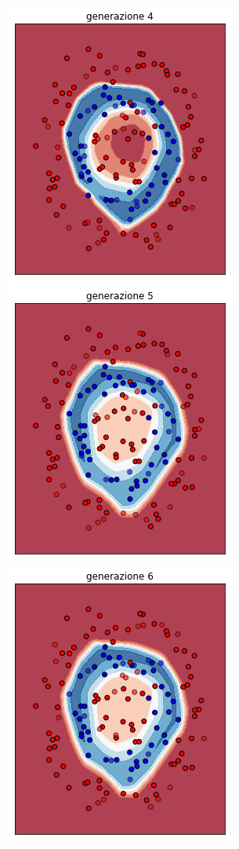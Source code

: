 \documentclass[12pt,a4paper]{report}
\begin{document}
\begin{figure}[H]
 \\
 \includegraphics[scale = 0.35]{images/circle+-rnd-acc./4}
 \includegraphics[scale = 0.35]{images/circle+-rnd-acc./5}
 \includegraphics[scale = 0.35]{images/circle+-rnd-acc./6}

\end{figure}
\end{document}
